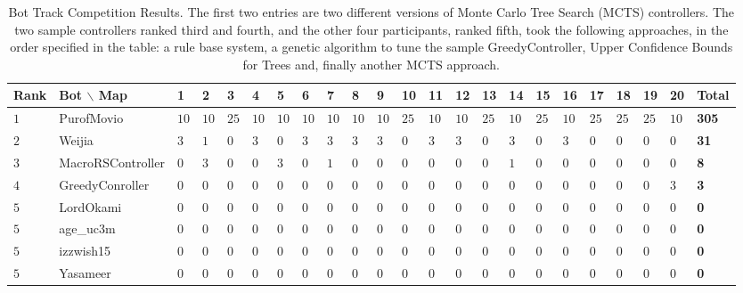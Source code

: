 \documentclass[conference]{IEEEtran}
\begin{document}
\begin{table}[!t]
	\centering
	\begin{tabular}{|>{\centering\arraybackslash}m{0.65cm}|>{\centering\arraybackslash}m{2.6cm}|p{0.19cm}|p{0.19cm}|p{0.19cm}|p{0.19cm}|p{0.19cm}|p{0.19cm}|p{0.19cm}|p{0.19cm}|p{0.19cm}|p{0.2cm}|p{0.2cm}|p{0.2cm}|p{0.2cm}|p{0.2cm}|p{0.2cm}|p{0.2cm}|p{0.2cm}|p{0.2cm}|p{0.2cm}|p{0.2cm}|>{\centering\arraybackslash}m{0.6cm}|}
		\hline	
		\textbf{Rank} & \textbf{Bot} $\backslash$ \textbf{Map}&\textbf{1}&\textbf{2}&\textbf{3}&\textbf{4}&\textbf{5}&\textbf{6}&\textbf{7}&\textbf{8}&\textbf{9}&\textbf{10}&\textbf{11}&\textbf{12}&\textbf{13}&\textbf{14}&\textbf{15}&\textbf{16}&\textbf{17}&\textbf{18}&\textbf{19}&\textbf{20}&\textbf{Total}\\
		\hline
$1$&PurofMovio&$10$&$10$&$25$&$10$&$10$&$10$&$10$&$10$&$10$&$25$&$10$&$10$&$25$&$10$&$25$&$10$&$25$&$25$&$25$&$10$&\textbf{305}\\
		\hline
$2$&Weijia&$3$&$1$&$0$&$3$&$0$&$3$&$3$&$3$&$3$&$0$&$3$&$3$&$0$&$3$&$0$&$3$&$0$&$0$&$0$&$0$&\textbf{31}\\
		\hline
$3$&MacroRSController&$0$&$3$&$0$&$0$&$3$&$0$&$1$&$0$&$0$&$0$&$0$&$0$&$0$&$1$&$0$&$0$&$0$&$0$&$0$&$0$&\textbf{8}\\
		\hline
$4$&GreedyConroller&$0$&$0$&$0$&$0$&$0$&$0$&$0$&$0$&$0$&$0$&$0$&$0$&$0$&$0$&$0$&$0$&$0$&$0$&$0$&$3$&\textbf{3}\\
		\hline
$5$&LordOkami&$0$&$0$&$0$&$0$&$0$&$0$&$0$&$0$&$0$&$0$&$0$&$0$&$0$&$0$&$0$&$0$&$0$&$0$&$0$&$0$&\textbf{0}\\
		\hline
$5$&age\_uc3m&$0$&$0$&$0$&$0$&$0$&$0$&$0$&$0$&$0$&$0$&$0$&$0$&$0$&$0$&$0$&$0$&$0$&$0$&$0$&$0$&\textbf{0}\\
		\hline
$5$&izzwish15&$0$&$0$&$0$&$0$&$0$&$0$&$0$&$0$&$0$&$0$&$0$&$0$&$0$&$0$&$0$&$0$&$0$&$0$&$0$&$0$&\textbf{0}\\
		\hline
$5$&Yasameer&$0$&$0$&$0$&$0$&$0$&$0$&$0$&$0$&$0$&$0$&$0$&$0$&$0$&$0$&$0$&$0$&$0$&$0$&$0$&$0$&\textbf{0}\\
		\hline
	\end{tabular}
	\caption{Bot Track Competition Results. The first two entries are two different versions of Monte Carlo Tree Search (MCTS) controllers. The two sample controllers ranked third and fourth, and the other four participants, ranked fifth, took the following approaches, in the order specified in the table: a rule base system, a genetic algorithm to tune the sample GreedyController, Upper Confidence Bounds for Trees and, finally another MCTS approach.}
	\label{tab:res1}
\end{table}
\end{document}
